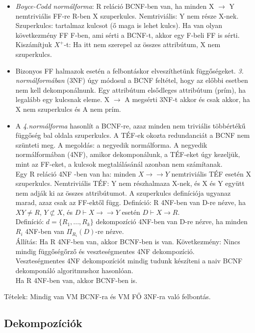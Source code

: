 \documentclass[margin=0px]{article}
\begin{document}
\begin{itemize}
    \item \textit{Boyce-Codd normálforma}: R reláció BCNF-ben van, ha minden X $\to$ Y nemtriviális FF-re R-ben X szuperkulcs. Nemtriviális: Y nem része X-nek. Szuperkulcs: tartalmaz kulcsot (ő maga is lehet kulcs). Ha van olyan következmény FF F-ben, ami sérti a BCNF-t, akkor egy F-beli FF is sérti. Kiszámítjuk $X^+$-t: Ha itt nem szerepel az összes attribútum, X nem szuperkulcs.
    \item Bizonyos FF halmazok esetén a felbontáskor elveszíthetünk függőségeket. \textit{3. normálformában} (3NF) úgy módosul a BCNF feltétel, hogy az előbbi esetben nem kell dekomponálnunk. Egy attribútum elsődleges attribútum (prím), ha legalább egy kulcsnak eleme. X $\to$ A megsérti 3NF-t akkor és csak akkor, ha X nem szuperkulcs és A nem prím.
    \item A \textit{4.normálforma} hasonlít a BCNF-re, azaz minden nem triviális többértékű függőség bal oldala szuperkulcs. A TÉF-ek okozta redundanciát a BCNF nem szünteti meg. A megoldás: a negyedik normálforma. A negyedik normálformában (4NF), amikor dekomponálunk, a TÉF-eket úgy kezeljük, mint az FF-eket, a kulcsok megtalálásánál azonban nem számítanak.\\
          Egy R reláció 4NF -ben van ha: minden $X \to\to Y$ nemtriviális TÉF esetén X szuperkulcs. Nemtriviális TÉF: Y nem részhalmaza X-nek, és X és Y együtt nem adják ki az összes attribútumot. A szuperkulcs definíciója ugyanaz marad, azaz csak az FF-ektől függ.
          Definíció: R 4NF-ben van D-re nézve, ha $XY \neq R$, $Y \not\subset X$, és $D \vdash X \to\to Y$ esetén $D \vdash X \to R$.\\
          Definíció: $d=\{R_1,...,R_k\}$ dekompozíció 4NF-ben van D-re nézve, ha minden $R_i$ 4NF-ben van $\Pi_{R_i}(D)$-re nézve.\\
          Állítás: Ha R 4NF-ben van, akkor BCNF-ben is van. Következmény: Nincs mindig függőségőrző és veszteségmentes 4NF dekompozíció.\\
          Veszteségmentes 4NF dekompozíciót mindig tudunk készíteni a naiv BCNF dekomponáló algoritmushoz hasonlóan. \\
          Ha R 4NF-ben van, akkor BCNF-ben is.
\end{itemize}
Tételek: Mindig van VM BCNF-ra és VM FŐ 3NF-ra való felbontás.

\subsection{Dekompozíciók}
\end{document}

